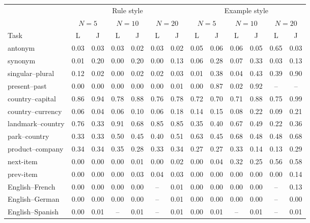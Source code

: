 \begin{tabular}{@{}lcccccccccccc@{}}
\toprule
 & \multicolumn{6}{c}{Rule style} & \multicolumn{6}{c}{Example style} \\
\cmidrule(lr){2-7}\cmidrule(lr){8-13}
 & \multicolumn{2}{c}{$N=5$} & \multicolumn{2}{c}{$N=10$} & \multicolumn{2}{c}{$N=20$} & \multicolumn{2}{c}{$N=5$} & \multicolumn{2}{c}{$N=10$} & \multicolumn{2}{c}{$N=20$} \\
\cmidrule(lr){2-3}\cmidrule(lr){4-5}\cmidrule(lr){6-7}\cmidrule(lr){8-9}\cmidrule(lr){10-11}\cmidrule(lr){12-13}
Task & L & J & L & J & L & J & L & J & L & J & L & J \\
\midrule
antonym & 0.03 & 0.03 & 0.03 & 0.02 & 0.03 & 0.02 & 0.05 & 0.06 & 0.06 & 0.05 & 0.65 & 0.03 \\
synonym & 0.01 & 0.20 & 0.00 & 0.20 & 0.00 & 0.13 & 0.06 & 0.28 & 0.07 & 0.33 & 0.03 & 0.13 \\
singular--plural & 0.12 & 0.02 & 0.00 & 0.02 & 0.02 & 0.03 & 0.01 & 0.38 & 0.04 & 0.43 & 0.39 & 0.90 \\
present--past & 0.00 & 0.00 & 0.00 & 0.00 & 0.00 & 0.01 & 0.00 & 0.87 & 0.02 & 0.92 & -- & -- \\
country--capital & 0.86 & 0.94 & 0.78 & 0.88 & 0.76 & 0.78 & 0.72 & 0.70 & 0.71 & 0.88 & 0.75 & 0.99 \\
country--currency & 0.06 & 0.04 & 0.06 & 0.10 & 0.06 & 0.18 & 0.14 & 0.15 & 0.08 & 0.22 & 0.09 & 0.21 \\
landmark--country & 0.76 & 0.33 & 0.91 & 0.68 & 0.85 & 0.85 & 0.35 & 0.40 & 0.67 & 0.49 & 0.22 & 0.36 \\
park--country & 0.33 & 0.33 & 0.50 & 0.45 & 0.40 & 0.51 & 0.63 & 0.45 & 0.68 & 0.48 & 0.48 & 0.68 \\
product--company & 0.34 & 0.34 & 0.35 & 0.28 & 0.33 & 0.34 & 0.27 & 0.27 & 0.33 & 0.14 & 0.13 & 0.29 \\
next-item & 0.00 & 0.00 & 0.00 & 0.01 & 0.00 & 0.02 & 0.00 & 0.04 & 0.32 & 0.25 & 0.56 & 0.58 \\
prev-item & 0.00 & 0.00 & 0.00 & 0.03 & 0.04 & 0.03 & 0.00 & 0.00 & 0.00 & 0.00 & 0.00 & 0.14 \\
English--French & 0.00 & 0.00 & 0.00 & 0.00 & -- & 0.01 & 0.00 & 0.00 & 0.00 & 0.00 & -- & 0.13 \\
English--German & 0.00 & 0.00 & 0.00 & 0.00 & -- & 0.01 & 0.00 & 0.00 & 0.00 & 0.00 & -- & 0.00 \\
English--Spanish & 0.00 & 0.01 & -- & 0.01 & -- & 0.01 & 0.00 & 0.01 & -- & 0.01 & -- & 0.01 \\
\bottomrule
\end{tabular}
